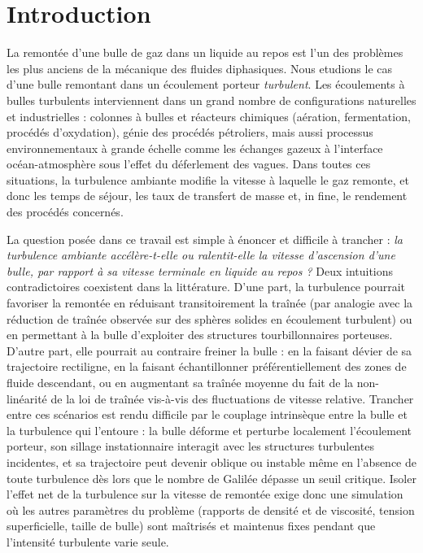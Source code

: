 \section{Introduction}

La remontée d'une bulle de gaz dans un liquide au repos est l'un des problèmes les
plus anciens de la mécanique des fluides diphasiques. Nous etudions le cas d'une bulle 
remontant dans un écoulement porteur \emph{turbulent}. Les écoulements à bulles
turbulents interviennent dans un grand nombre de configurations naturelles et
industrielles : colonnes à bulles et réacteurs chimiques (aération, fermentation,
procédés d'oxydation), génie des procédés pétroliers, mais aussi processus
environnementaux à grande échelle comme les échanges gazeux à l'interface
océan-atmosphère sous l'effet du déferlement des vagues. Dans toutes ces
situations, la turbulence ambiante modifie la vitesse à laquelle le gaz remonte, 
et donc les temps de séjour, les taux de transfert de masse et, in fine, le rendement
des procédés concernés.

La question posée dans ce travail est simple à énoncer et difficile à trancher :
\emph{la turbulence ambiante accélère-t-elle ou ralentit-elle la vitesse
d'ascension d'une bulle, par rapport à sa vitesse terminale en liquide au repos ?}
Deux intuitions contradictoires coexistent dans la littérature. D'une part, la
turbulence pourrait favoriser la remontée en réduisant transitoirement la traînée
(par analogie avec la réduction de traînée observée sur des sphères solides en
écoulement turbulent) ou en permettant à la bulle d'exploiter des structures
tourbillonnaires porteuses. D'autre part, elle pourrait au contraire freiner la
bulle : en la faisant dévier de sa trajectoire rectiligne, en la faisant
échantillonner préférentiellement des zones de fluide descendant, ou en augmentant
sa traînée moyenne du fait de la non-linéarité de la loi de traînée vis-à-vis des
fluctuations de vitesse relative. Trancher entre ces scénarios est rendu difficile
par le couplage intrinsèque entre la bulle et la turbulence qui l'entoure : la
bulle déforme et perturbe localement l'écoulement porteur, son sillage instationnaire
interagit avec les structures turbulentes incidentes, et sa trajectoire peut devenir
oblique ou instable même en l'absence de toute turbulence dès lors que le nombre de
Galilée dépasse un seuil critique. Isoler l'effet net de la turbulence sur la
vitesse de remontée exige donc une simulation où les autres
paramètres du problème (rapports de densité et de viscosité, tension superficielle,
taille de bulle) sont maîtrisés et maintenus fixes pendant que l'intensité
turbulente varie seule.

